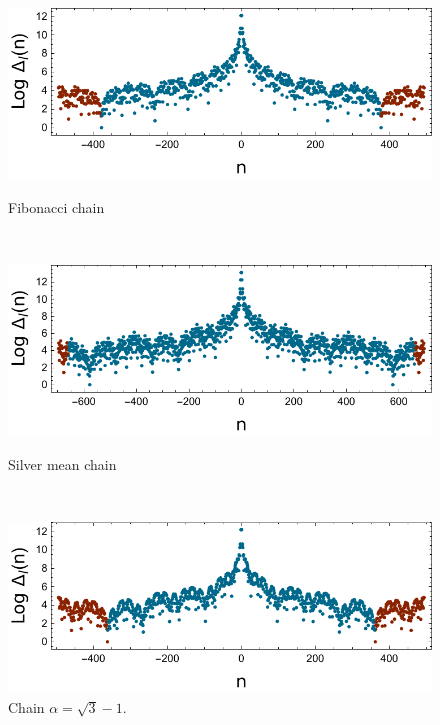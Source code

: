 \documentclass[a4paper]{jpconf}
\begin{document}
\begin{figure}[htp]
	\centering
	\begin{minipage}{0.3\textwidth}
		\centering
		\includegraphics[width=1.\textwidth]{img/loggapwidth_Fibonacci_l_16.pdf}
		\caption{\small{Fibonacci chain}}
		\label{fig:width1}
	\end{minipage}~~
	\begin{minipage}{0.3\textwidth}
		\centering
		\includegraphics[width=1.\textwidth]{img/loggapwidth_Silver_l_10.pdf}
		\caption{\small{Silver mean chain}}
		\label{fig:width2}
	\end{minipage}~~
	\begin{minipage}{0.3\textwidth}
		\centering
		\includegraphics[width=1.\textwidth]{img/loggapwidth_sqrt3_l_12.pdf}
		\caption{\small{Chain $\alpha = \sqrt{3}-1$.}}
		\label{fig:width3}
	\end{minipage}
\end{figure}
\end{document}
